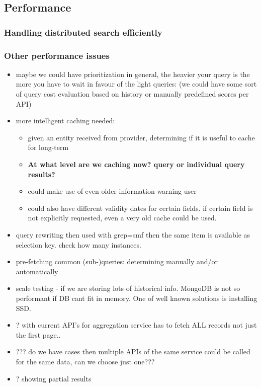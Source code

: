 \documentclass[a4paper,11pt,draft]{article}
\begin{document}
\subsection{Performance}
\subsubsection{Handling distributed search efficiently}

\subsubsection{Other performance issues}
	     \begin{itemize}
	     					\item  {\color{red}maybe we could have prioritization in general, the heavier your query is the more you have to wait in favour of  the light queries}: 
	     					(we could have some sort of query cost evaluation based on history or manually predefined scores per API)
	     					
	                		\item more intelligent caching needed:
	                			\begin{itemize}
	                			\item given an entity received from provider, determining if it is useful to cache for long-term
	                			\item \textbf{\color{red}At what level are we caching now? query or individual query results?}
	                			\item could make use of even older information warning user
	                			\item could also have different validity dates for certain fields. if certain field is not explicitly requested, even a very old cache could be used.
	                			\end{itemize}
	                	  
	                		\item query rewriting then used with grep=smf then the same item is available as selection key. check how many instances.
	                		\item pre-fetching common (sub-)queries: determining manually and/or automatically
	                		\item scale testing - if we are storing lots of historical info. MongoDB is not so performant if DB cant fit in memory. One of well known solutions is installing SSD.
                        \item ? with current API's for aggregation service has to fetch ALL records not just the first page..
                        \item ??? do we have cases then multiple APIs of the same service could be called for the same data, can we choose just one???
                        \item ? showing partial results
        \end{itemize}
\end{document}
